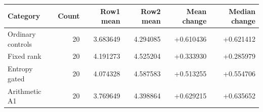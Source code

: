 \begin{tabular}{@{}lrrrrr@{}}
\toprule
Category & Count & Row1 mean & Row2 mean & Mean change & Median change \\
\midrule
Ordinary controls & 20 & 3.683649 & 4.294085 & +0.610436 & +0.621412 \\
Fixed rank & 20 & 4.191273 & 4.525204 & +0.333930 & +0.285979 \\
Entropy gated & 20 & 4.074328 & 4.587583 & +0.513255 & +0.554706 \\
Arithmetic A1 & 20 & 3.769649 & 4.398864 & +0.629215 & +0.635652 \\
\bottomrule
\end{tabular}

